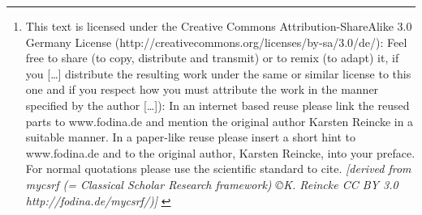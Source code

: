 %
%
%
%

\author{Karsten Reincke\footnote{This text is licensed under the Creative
Commons Attribution-ShareAlike 3.0 Germany License
(http://creativecommons.org/licenses/by-sa/3.0/de/): Feel free \glqq{}to share
(to copy, distribute and transmit)\grqq{} or \glqq{}to remix (to adapt)\grqq{}
it, if you \glqq{}[\ldots] distribute the resulting work under the same or
similar license to this one\grqq{} and if you respect how \glqq{}you must
attribute the work in the manner specified by the author [\ldots]\grqq{}):
\newline
In an internet based reuse please link the reused parts to www.fodina.de and
mention the original author Karsten Reincke in a suitable manner. In a
paper-like reuse please insert a short hint to www.fodina.de and to the original
author, Karsten Reincke, into your preface. For normal quotations please use the
scientific standard to cite.
\newline
{ \tiny \itshape [derived from mycsrf (= Classical Scholar
Research framework) \copyright K. Reincke CC BY 3.0 http://fodina.de/mycsrf/)] }
}}

